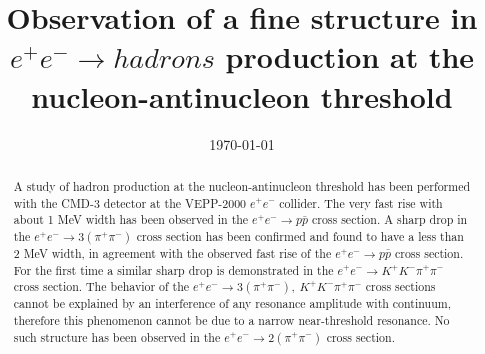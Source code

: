 \documentclass[12pt]{elsarticle}
\begin{document}
\date{\today}

\title{\bf{ \boldmath
Observation of a fine structure in $e^+e^-\to hadrons$ production at the 
nucleon-antinucleon threshold
}}




%
\vspace{0.7cm}
\begin{abstract}
\hspace*{\parindent}
A study of  hadron production at the nucleon-antinucleon threshold has been
performed with the CMD-3 detector at the VEPP-2000  $e^+e^-$ collider. 
The very fast rise with about 1 MeV width has been observed in the $e^+e^- \to p\bar p$ cross section.
A sharp drop in the $e^+e^- \to 3(\pi^+\pi^-)$ cross section has been confirmed and found
to have a less than 2 MeV width, 
in agreement with the observed fast rise of the $e^+e^- \to p\bar p$ cross
section. For the first time a similar sharp drop is demonstrated in the
$e^+e^- \to K^+K^-\pi^+\pi^-$ cross section. The behavior of the
$e^+e^- \to 3(\pi^+\pi^-),~ K^+K^-\pi^+\pi^-$ cross sections cannot be explained
by an interference of any resonance amplitude with continuum, therefore this
phenomenon cannot be due to a narrow near-threshold resonance.  No such
structure has been observed in the $e^+e^- \to 2(\pi^+\pi^-)$ cross section.
\end{abstract}


\maketitle

%
\baselineskip=17pt
%
\end{document}
